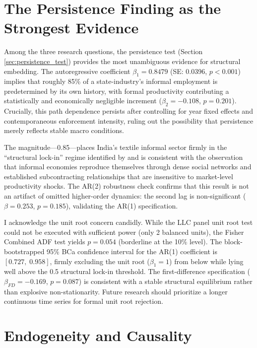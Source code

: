\section{The Persistence Finding as the Strongest Evidence}
\label{sec:persistence_interpretation}

	Among the three research questions, the persistence test (Section \ref{sec:persistence_test}) provides the most unambiguous evidence for structural embedding. The autoregressive coefficient $\beta_1 = 0.8479$ (SE: 0.0396, $p < 0.001$) implies that roughly 85\% of a state-industry's informal employment is predetermined by its own history, with formal productivity contributing a statistically and economically negligible increment ($\beta_2 = -0.108$, $p = 0.201$). Crucially, this path dependence persists after controlling for year fixed effects and contemporaneous enforcement intensity, ruling out the possibility that persistence merely reflects stable macro conditions.

The magnitude—0.85—places India's textile informal sector firmly in the ``structural lock-in'' regime identified by \textcite{Portes1989} and is consistent with the \textcite{Venkatesh2006} observation that informal economies reproduce themselves through dense social networks and established subcontracting relationships that are insensitive to market-level productivity shocks. The AR(2) robustness check confirms that this result is not an artifact of omitted higher-order dynamics: the second lag is non-significant ($\beta = 0.253$, $p = 0.185$), validating the AR(1) specification.

I acknowledge the unit root concern candidly. While the LLC panel unit root test could not be executed with sufficient power (only 2 balanced units), the Fisher Combined ADF test yields $p = 0.054$ (borderline at the 10\% level). The block-bootstrapped 95\% BCa confidence interval for the AR(1) coefficient is $[0.727,\; 0.958]$, firmly excluding the unit root ($\beta_1=1$) from below while lying well above the 0.5 structural lock-in threshold. The first-difference specification ($\beta_{FD} = -0.169$, $p = 0.087$) is consistent with a stable structural equilibrium rather than explosive non-stationarity. Future research should prioritize a longer continuous time series for formal unit root rejection.

\section{Endogeneity and Causality}
\label{sec:causality}

